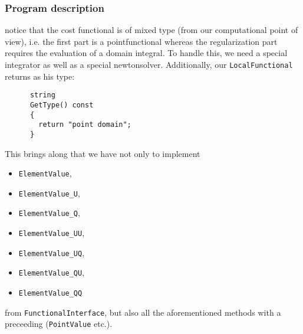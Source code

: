 \subsubsection{Program description}
notice that the cost functional is of mixed type (from our computational point of view), i.e. the first part is a pointfunctional whereas the regularization part requires the evaluation of a domain integral. To handle this, we need a special integrator as well as a special newtonsolver. Additionally, our \texttt{LocalFunctional} returns as his type:
\begin{verbatim}
      string
      GetType() const
      {
        return "point domain";
      }
\end{verbatim}
This brings along that we have not only to implement 
\begin{itemize} 
\item \texttt{ElementValue},
\item \texttt{ElementValue\_U},
\item \texttt{ElementValue\_Q}, 
\item \texttt{ElementValue\_UU},
\item \texttt{ElementValue\_UQ},
\item \texttt{ElementValue\_QU},
\item \texttt{ElementValue\_QQ}
\end{itemize}
 from \texttt{FunctionalInterface}, but also all the aforementioned methods with a preceeding  (\texttt{PointValue} etc.).

